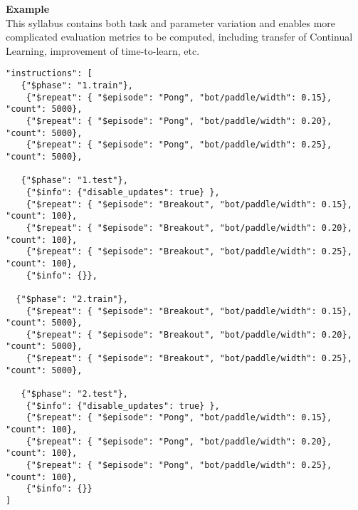 \textbf{Example}\\[0.1in]

This syllabus contains both task and parameter variation and enables more complicated evaluation metrics to be computed, including transfer of Continual Learning, improvement of time-to-learn, etc.

\begin{small}
\begin{verbatim}
"instructions": [    
   {"$phase": "1.train"}, 
    {"$repeat": { "$episode": "Pong", "bot/paddle/width": 0.15}, "count": 5000}, 
    {"$repeat": { "$episode": "Pong", "bot/paddle/width": 0.20}, "count": 5000},
    {"$repeat": { "$episode": "Pong", "bot/paddle/width": 0.25}, "count": 5000},

   {"$phase": "1.test"},   
    {"$info": {"disable_updates": true} },
    {"$repeat": { "$episode": "Breakout", "bot/paddle/width": 0.15}, "count": 100}, 
    {"$repeat": { "$episode": "Breakout", "bot/paddle/width": 0.20}, "count": 100},
    {"$repeat": { "$episode": "Breakout", "bot/paddle/width": 0.25}, "count": 100},
    {"$info": {}},
   
  {"$phase": "2.train"},  
    {"$repeat": { "$episode": "Breakout", "bot/paddle/width": 0.15}, "count": 5000}, 
    {"$repeat": { "$episode": "Breakout", "bot/paddle/width": 0.20}, "count": 5000},
    {"$repeat": { "$episode": "Breakout", "bot/paddle/width": 0.25}, "count": 5000},

   {"$phase": "2.test"},   
    {"$info": {"disable_updates": true} },
    {"$repeat": { "$episode": "Pong", "bot/paddle/width": 0.15}, "count": 100}, 
    {"$repeat": { "$episode": "Pong", "bot/paddle/width": 0.20}, "count": 100},
    {"$repeat": { "$episode": "Pong", "bot/paddle/width": 0.25}, "count": 100},
    {"$info": {}}
]
\end{verbatim}
\end{small}
